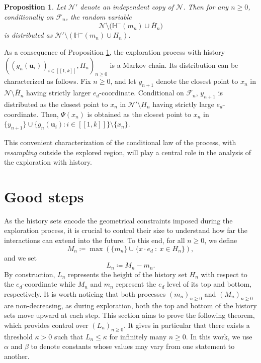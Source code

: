 \documentclass[a4paper, 11pt]{article}
\theoremstyle{plain}
\newtheorem{Proposition}[Theorem]{Proposition}
\theoremstyle{definition}
\newcommand{\range}[2]{[\![#1,#2]\!]}
\numberwithin{equation}{section}
\begin{document}
\begin{Proposition}
    \label{prop_resampling}
    Let $\mathcal N'$ denote an independent copy of $\mathcal N$. Then for any $n\geq 0$, conditionally on $\mathcal F_n$, the random variable
        \[\mathcal N\setminus\big(\mathbb H^-(m_n)\cup \overline{H}_n\big)\]
    is distributed as $\mathcal N'\setminus(\mathbb H^-(m_n)\cup H_n)$.
\end{Proposition}

As a consequence of Proposition \ref{prop_resampling}, the exploration process with history $((g_n(\mathbf u_i))_{i\in\range{1}{k}}, H_n)_{n\geq 0}$ is a Markov chain. Its distribution can be characterized as follows. Fix $n\geq 0$, and let $y_{n+1}$ denote the closest point to $x_n$ in $\mathcal N\setminus\overline{H}_n$ having strictly larger $e_d$-coordinate. Conditional on $\mathcal F_n$, $y_{n+1}$ is distributed as the closest point to $x_n$ in $\mathcal N'\setminus H_n$ having strictly large $e_d$-coordinate. Then, $\Psi(x_n)$ is obtained as the closest point to $x_n$ in $\{y_{n+1}\}\cup\{g_n(\mathbf u_i):i\in\range{1}{k}\}\setminus\{x_n\}$.

This convenient characterization of the conditional law of the process, with \emph{resampling} outside the explored region, will play a central role in the analysis of the exploration with history.

\section{Good steps}

\label{section_good_steps}

As the history sets encode the geometrical constraints imposed during the exploration process, it is crucial to control their size to understand how far the interactions can extend into the future. To this end, for all $n\geq0$, we define
    \[M_n\coloneqq\max(\{m_n\}\cup\{x\cdot e_d~:~x\in H_n\}),\]
and we set
    \[L_n\coloneqq M_n-m_n.\]
By construction, $L_n$ represents the height of the history set $H_n$ with respect to the $e_d$-coordinate while $M_n$ and $m_n$ represent the $e_d$ level of its top and bottom, respectively. It is worth noticing that both processes $(m_n)_{n\geq0}$ and $(M_n)_{n\geq 0}$ are non-decreasing, as during exploration, both the top and bottom of the history sets move upward at each step. This section aims to prove the following theorem, which provides control over $(L_n)_{n\geq0}$. It gives in particular that there exists a threshold $\kappa>0$ such that $L_n\leq\kappa$ for infinitely many $n\geq 0$. In this work, we use $\alpha$ and $\beta$ to denote constants whose values may vary from one statement to another.
\end{document}
